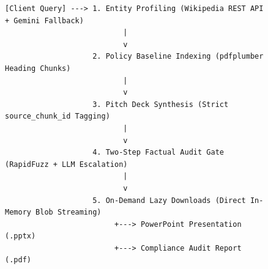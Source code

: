\documentclass[11pt,a4paper]{article}
\begin{document}
\begin{figure}[h!]
\centering
\small
\begin{verbatim}
[Client Query] ---> 1. Entity Profiling (Wikipedia REST API + Gemini Fallback)
                           |
                           v
                    2. Policy Baseline Indexing (pdfplumber Heading Chunks)
                           |
                           v
                    3. Pitch Deck Synthesis (Strict source_chunk_id Tagging)
                           |
                           v
                    4. Two-Step Factual Audit Gate (RapidFuzz + LLM Escalation)
                           |
                           v
                    5. On-Demand Lazy Downloads (Direct In-Memory Blob Streaming)
                         +---> PowerPoint Presentation (.pptx)
                         +---> Compliance Audit Report (.pdf)
\end{verbatim}
\end{figure}
\end{document}
